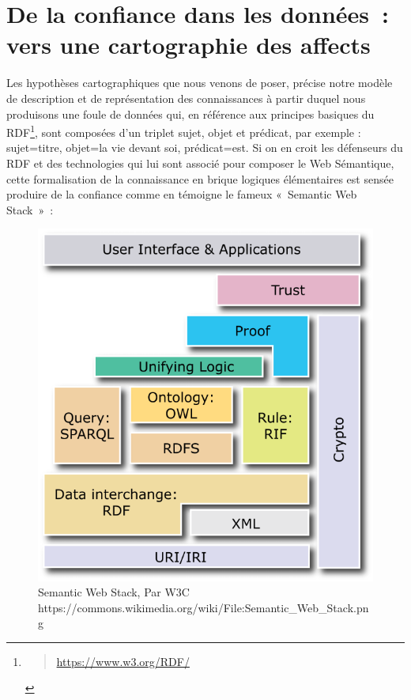 \documentclass[
  letterpaper,
  DIV=11,
  numbers=noendperiod]{scrreprt}
\begin{document}
\hypertarget{sec-confianceDonnees}{%
\section{De la confiance dans les données~: vers une cartographie des
affects}\label{sec-confianceDonnees}}

Les hypothèses cartographiques que nous venons de poser, précise notre
modèle de description et de représentation des connaissances à partir
duquel nous produisons une foule de données qui, en référence aux
principes basiques du RDF\footnote{\begin{quote}
  \url{https://www.w3.org/RDF/}
  \end{quote}}, sont composées d'un triplet sujet, objet et prédicat,
par exemple : sujet=titre, objet=la vie devant soi, prédicat=est. Si on
en croit les défenseurs du RDF et des technologies qui lui sont associé
pour composer le Web Sémantique, cette formalisation de la connaissance
en brique logiques élémentaires est sensée produire de la confiance
comme en témoigne le fameux «~Semantic Web Stack~»~:

\begin{figure}

{\centering \includegraphics{media/1000000100000258000002762CF3B23905723B38.png}

}

\caption{\label{fig-semanticWebStack}Semantic Web Stack, Par W3C
https://commons.wikimedia.org/wiki/File:Semantic\_Web\_Stack.png}

\end{figure}
\end{document}
